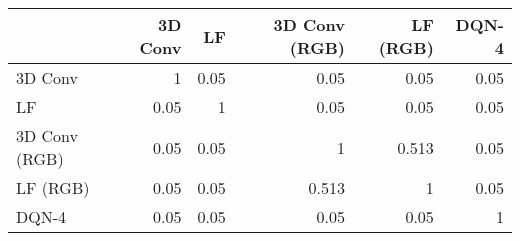 \begin{tabular}{lrrrrr}
\hline
               &   3D Conv &   LF &   3D Conv (RGB) &   LF (RGB) &   DQN-4 \\
\hline
 3D Conv       &      1    & 0.05 &           0.05  &      0.05  &    0.05 \\
 LF            &      0.05 & 1    &           0.05  &      0.05  &    0.05 \\
 3D Conv (RGB) &      0.05 & 0.05 &           1     &      0.513 &    0.05 \\
 LF (RGB)      &      0.05 & 0.05 &           0.513 &      1     &    0.05 \\
 DQN-4         &      0.05 & 0.05 &           0.05  &      0.05  &    1    \\
\hline
\end{tabular}
